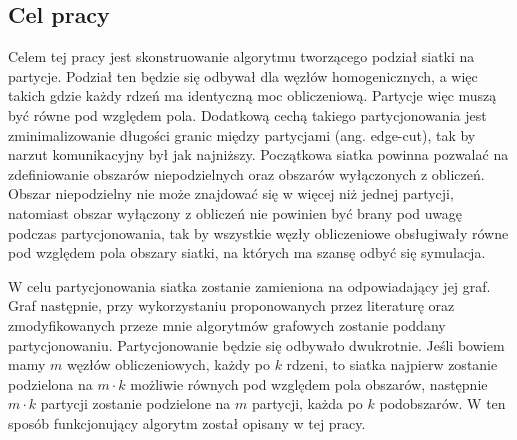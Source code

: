 \subsection{Cel pracy}
Celem tej pracy jest skonstruowanie algorytmu tworzącego podział siatki na partycje.
Podział ten będzie się odbywał dla węzłów homogenicznych, a więc takich gdzie każdy rdzeń ma identyczną moc obliczeniową.
Partycje więc muszą być równe pod względem pola.
Dodatkową cechą takiego partycjonowania jest zminimalizowanie długości granic między partycjami (ang. edge-cut),
tak by narzut komunikacyjny był jak najniższy.
Początkowa siatka powinna pozwalać na zdefiniowanie obszarów niepodzielnych oraz obszarów wyłączonych z obliczeń.
Obszar niepodzielny nie może znajdować się w więcej niż jednej partycji, natomiast
obszar wyłączony z obliczeń nie powinien być brany pod uwagę podczas partycjonowania, tak by wszystkie węzły obliczeniowe
obsługiwały równe pod względem pola obszary siatki, na których ma szansę odbyć się symulacja.

W celu partycjonowania siatka zostanie zamieniona na odpowiadający jej graf.
Graf następnie, przy wykorzystaniu proponowanych przez literaturę oraz zmodyfikowanych przeze mnie algorytmów grafowych
zostanie poddany partycjonowaniu.
Partycjonowanie będzie się odbywało dwukrotnie.
Jeśli bowiem mamy $m$ węzłów obliczeniowych, każdy po $k$ rdzeni, to siatka najpierw zostanie podzielona na
$m \cdot k$ możliwie równych pod względem pola obszarów, następnie $m \cdot k$ partycji zostanie podzielone
na $m$ partycji, każda po $k$ podobszarów.
W ten sposób funkcjonujący algorytm został opisany w tej pracy.